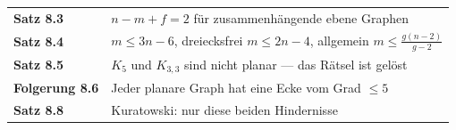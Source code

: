 \begin{merksatz}
\begin{center}
\renewcommand{\arraystretch}{1.5}
\begin{tabular}{@{}P{3.0cm}P{5.6cm}@{}}
\toprule
\textbf{Satz 8.3} & $n - m + f = 2$ für zusammenhängende ebene Graphen\\
\textbf{Satz 8.4} & $m \le 3n-6$, dreiecksfrei $m \le 2n-4$, allgemein $m \le \frac{g(n-2)}{g-2}$\\
\textbf{Satz 8.5} & $K_5$ und $K_{3,3}$ sind nicht planar --- das Rätsel ist gelöst\\
\textbf{Folgerung 8.6} & Jeder planare Graph hat eine Ecke vom Grad $\le 5$\\
\textbf{Satz 8.8} & Kuratowski: nur diese beiden Hindernisse\\
\bottomrule
\end{tabular}
\end{center}

\begin{center}
\begin{minipage}{0.88\textwidth}
\end{minipage}
\end{center}
\end{merksatz}
